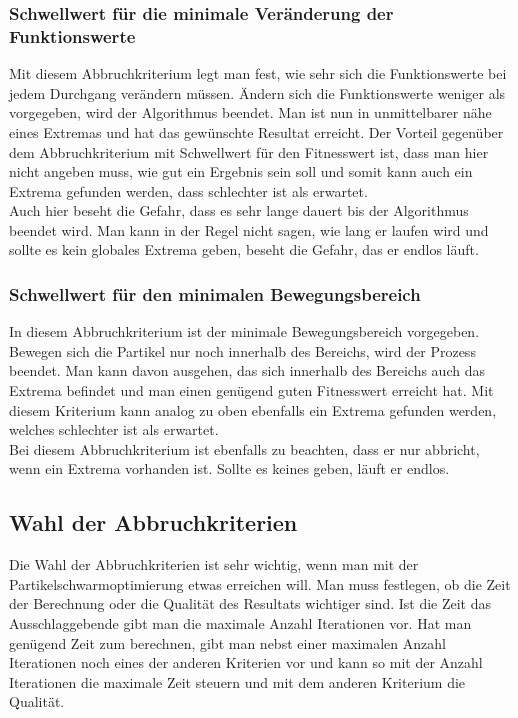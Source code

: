 \subsubsection{Schwellwert für die minimale Veränderung der Funktionswerte}
Mit diesem Abbruchkriterium legt man fest, wie sehr sich die Funktionswerte bei jedem Durchgang verändern müssen. Ändern sich die Funktionswerte weniger als vorgegeben, wird der Algorithmus beendet. Man ist nun in unmittelbarer nähe eines Extremas und hat das gewünschte Resultat erreicht. Der Vorteil gegenüber dem Abbruchkriterium mit Schwellwert für den Fitnesswert ist, dass man hier nicht angeben muss, wie gut ein Ergebnis sein soll und somit kann auch ein Extrema gefunden werden, dass schlechter ist als erwartet. \\ 
Auch hier beseht die Gefahr, dass es sehr lange dauert bis der Algorithmus beendet wird. Man kann in der Regel nicht sagen, wie lang er laufen wird und sollte es kein globales Extrema geben, beseht die Gefahr, das er endlos läuft. 

\subsubsection{Schwellwert für den minimalen Bewegungsbereich}
In diesem Abbruchkriterium ist der minimale Bewegungsbereich vorgegeben. Bewegen sich die Partikel nur noch innerhalb des Bereichs, wird der Prozess beendet. Man kann davon ausgehen, das sich innerhalb des Bereichs auch das Extrema befindet und man einen genügend guten Fitnesswert erreicht hat. Mit diesem Kriterium kann analog zu oben ebenfalls ein Extrema gefunden werden, welches schlechter ist als erwartet.\\
Bei diesem Abbruchkriterium ist ebenfalls zu beachten, dass er nur abbricht, wenn ein Extrema vorhanden ist. Sollte es keines geben, läuft er endlos.

\subsection{Wahl der Abbruchkriterien}
Die Wahl der Abbruchkriterien ist sehr wichtig, wenn man mit der Partikelschwarmoptimierung etwas erreichen will. Man muss festlegen, ob die Zeit der Berechnung oder die Qualität des Resultats wichtiger sind. Ist die Zeit das Ausschlaggebende gibt man die maximale Anzahl Iterationen vor. Hat man genügend Zeit zum berechnen, gibt man nebst einer maximalen Anzahl Iterationen noch eines der anderen Kriterien vor und kann so mit der Anzahl Iterationen die maximale Zeit steuern und mit dem anderen Kriterium die Qualität. 

